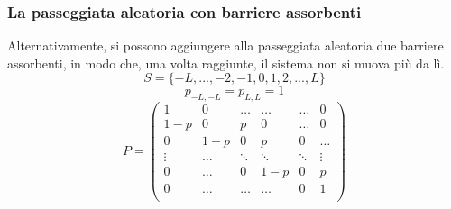 \subsubsection{La passeggiata aleatoria con barriere assorbenti}
Alternativamente, si possono aggiungere alla passeggiata aleatoria due barriere assorbenti, in modo che, una volta raggiunte, il sistema non si muova più da lì.
\[S = \{-L,...,-2,-1,0,1,2,...,L\}\]
\[p_{-L,-L} = p_{L,L} =1\]
\[
P = \begin{pmatrix}
1 & 0 & \hdots & \hdots & \hdots & 0\\
1-p & 0 & p & 0 & \hdots & 0\\
0 & 1-p & 0 & p & 0 & \hdots\\
\vdots & \hdots & \ddots & \ddots & \ddots & \vdots\\
0 & \hdots & 0 & 1-p & 0 & p\\
0 & \hdots & \hdots & \hdots & 0 & 1\\
\end{pmatrix}
\]